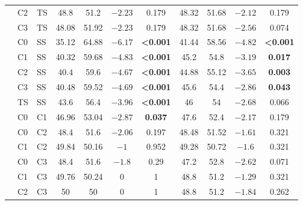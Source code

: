 \documentclass[11pt,UTF8,fontset=fandol]{ctexart}
\begin{document}
\begin{center}
\begin{longtable}{@{}lll cccc cccc@{}}
 & C2 & TS & 48.8 & 51.2 & $-2.23$ & 0.179 & 48.32 & 51.68 & $-2.12$ & 0.179 \\
 & C3 & TS & 48.08 & 51.92 & $-2.23$ & 0.179 & 48.32 & 51.68 & $-2.56$ & 0.074 \\
 & C0 & SS & 35.12 & 64.88 & $-6.17$ & \textbf{<0.001} & 41.44 & 58.56 & $-4.82$ & \textbf{<0.001} \\
 & C1 & SS & 40.32 & 59.68 & $-4.83$ & \textbf{<0.001} & 45.2 & 54.8 & $-3.19$ & \textbf{0.017} \\
 & C2 & SS & 40.4 & 59.6 & $-4.67$ & \textbf{<0.001} & 44.88 & 55.12 & $-3.65$ & \textbf{0.003} \\
 & C3 & SS & 40.48 & 59.52 & $-4.69$ & \textbf{<0.001} & 45.6 & 54.4 & $-2.86$ & \textbf{0.043} \\
 & TS & SS & 43.6 & 56.4 & $-3.96$ & \textbf{<0.001} & 46 & 54 & $-2.68$ & 0.066 \\
 & C0 & C1 & 46.96 & 53.04 & $-2.87$ & \textbf{0.037} & 47.6 & 52.4 & $-2.17$ & 0.179 \\
 & C0 & C2 & 48.4 & 51.6 & $-2.06$ & 0.197 & 48.48 & 51.52 & $-1.61$ & 0.321 \\
 & C1 & C2 & 49.84 & 50.16 & $-1$ & 0.952 & 49.28 & 50.72 & $-1.6$ & 0.321 \\
 & C0 & C3 & 48.4 & 51.6 & $-1.8$ & 0.29 & 47.2 & 52.8 & $-2.62$ & 0.071 \\
 & C1 & C3 & 49.76 & 50.24 & 0 & 1 & 48.8 & 51.2 & $-1.29$ & 0.321 \\
 & C2 & C3 & 50 & 50 & 0 & 1 & 48.8 & 51.2 & $-1.84$ & 0.262 \\
\end{longtable}
\end{center}
\end{document}
